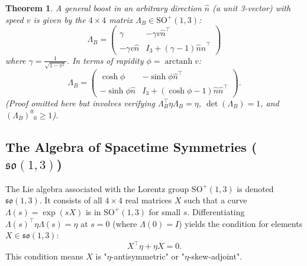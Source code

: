 \documentclass{amsart}
\newtheorem{theorem}{Theorem}[section]
\theoremstyle{definition}
\theoremstyle{remark}
\DeclareMathOperator{\arctanh}{arctanh}
\begin{document}
\begin{theorem}\label{thm:general_boost_so13}
  A general boost in an arbitrary direction $\hat{n}$ (a unit 3-vector) with speed $v$ is given by the $4 \times 4$ matrix $\Lambda_B \in \mathrm{SO}^+(1,3)$:
  \begin{equation*}
    \Lambda_B =
    \begin{pmatrix}
      \gamma & -\gamma v \hat{n}^\top \\
      -\gamma v \hat{n} & I_3 + \left(\gamma-1\right)\hat{n}\hat{n}^\top
    \end{pmatrix}
  \end{equation*}
  where $\gamma=\frac{1}{\sqrt{1-v^2}}$. In terms of rapidity $\phi=\arctanh v$:
  \begin{equation*}
    \Lambda_B =
    \begin{pmatrix}
      \cosh \phi & -\sinh \phi \hat{n}^\top \\
      -\sinh \phi \hat{n} & I_3 + (\cosh \phi - 1) \hat{n} \hat{n}^\top
    \end{pmatrix}.
  \end{equation*}
  (Proof omitted here but involves verifying $\Lambda_B^\top \eta \Lambda_B = \eta$, $\det(\Lambda_B)=1$, and $(\Lambda_B)^0{}_0 \ge 1$).
\end{theorem}


\subsection{The Algebra of Spacetime Symmetries ($\mathfrak{so}(1,3)$)}
\label{subsec:so13_algebra}
The Lie algebra associated with the Lorentz group $\mathrm{SO}^+(1,3)$ is denoted $\mathfrak{so}(1,3)$. It consists of all \(4 \times 4\) real matrices \(X\) such that a curve $\Lambda(s) = \exp(sX)$ is in $\mathrm{SO}^+(1,3)$ for small $s$. Differentiating $\Lambda(s)^\top \eta \Lambda(s) = \eta$ at $s=0$ (where $\Lambda(0)=I$) yields the condition for elements $X \in \mathfrak{so}(1,3)$:
\begin{equation*}
  X^\top \eta + \eta X = 0.
\end{equation*}
This condition means $X$ is "$\eta$-antisymmetric" or "$\eta$-skew-adjoint".
\end{document}
